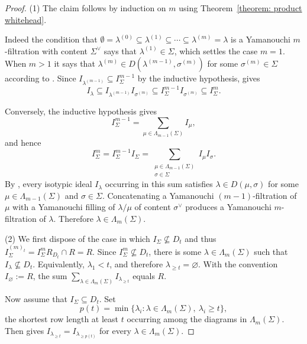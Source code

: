 \documentclass[11pt, reqno]{amsart}
\numberwithin{equation}{section}
\theoremstyle{definition}
\begin{document}
\begin{proof}

(1) The claim follows by induction on $m$ using Theorem~\ref{theorem: product whitehead}.

Indeed the condition that
$
\emptyset=\lambda^{(0)}\subseteq \lambda^{(1)}\subseteq\cdots\subseteq\lambda^{(m)}=\lambda
$
is a Yamanouchi $m$-filtration with content $\Sigma^\vee$ says that $\lambda^{(1)}\in \Sigma$, which settles the case $m=1$. When $m>1$ it says that $\lambda^{(m)}\in D(\lambda^{(m-1)},\sigma^{(m)})$  for some $\sigma^{(m)} \in \Sigma$ according to . Since $I_{\lambda^{(m-1)}}\subseteq I_\Sigma^{m-1}$ by the inductive hypothesis,  gives
\[
I_\lambda\subseteq I_{\lambda^{(m-1)}}I_{\sigma^{(m)}}
\subseteq I_\Sigma^{m-1}I_{\sigma^{(m)}}
\subseteq I_\Sigma^m.
\]

Conversely, the inductive hypothesis gives
\[
I_\Sigma^{m-1}=\sum_{\mu\in\Lambda_{m-1}(\Sigma)}I_\mu,
\]
and hence
\[
I_\Sigma^m=I_\Sigma^{m-1}I_\Sigma
 =\sum_{\substack{\mu\in\Lambda_{m-1}(\Sigma)\\ \sigma\in\Sigma}}I_\mu I_\sigma.
\]
By , every isotypic ideal $I_\lambda$ occurring in this sum satisfies $\lambda\in D(\mu,\sigma)$ for some $\mu\in\Lambda_{m-1}(\Sigma)$ and $\sigma\in\Sigma$. Concatenating a Yamanouchi $(m-1)$-filtration of $\mu$ with a Yamanouchi filling of $\lambda/\mu$ of content $\sigma^\vee$ produces a Yamanouchi $m$-filtration of $\lambda$. Therefore $\lambda\in\Lambda_m(\Sigma)$.

(2) We first dispose of the case in which $I_\Sigma\not\subseteq D_t$ and thus $
I_\Sigma^{(m)_t}=I_\Sigma^mR_{D_t}\cap R=R$. Since $I_\Sigma^m\not\subseteq D_t$, there is some
$\lambda\in\Lambda_m(\Sigma)$ such that $I_\lambda\not\subseteq D_t$.
Equivalently, $\lambda_1<t$, and therefore
$\lambda_{\geq t}=\varnothing$. With the convention
$I_\varnothing:=R$,
the sum $\sum_{\lambda\in\Lambda_m(\Sigma)}I_{\lambda_{\geq t}}$
 equals $R$.

Now assume that $I_\Sigma \subseteq D_t$.
Set
\[
p(t)=\min\{\lambda_i:\lambda\in\Lambda_m(\Sigma),\ \lambda_i\geq t\},
\]
the shortest row length at least $t$ occurring among the diagrams in $\Lambda_m(\Sigma)$. Then  gives
$I_{\lambda_{\geq t}}=I_{\lambda_{\geq p(t)}}$ for every $\lambda\in\Lambda_m(\Sigma)$.


\end{proof}
\end{document}
